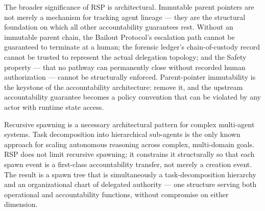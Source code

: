 The broader significance of RSP is architectural. Immutable parent pointers are not merely a mechanism for tracking agent lineage — they are the structural foundation on which all other accountability guarantees rest. Without an immutable parent chain, the Bailout Protocol's escalation path cannot be guaranteed to terminate at a human; the forensic ledger's chain-of-custody record cannot be trusted to represent the actual delegation topology; and the Safety property — that no pathway can permanently close without recorded human authorization — cannot be structurally enforced. Parent-pointer immutability is the keystone of the \bxthree{} accountability architecture: remove it, and the upstream accountability guarantee becomes a policy convention that can be violated by any actor with runtime state access.

Recursive spawning is a necessary architectural pattern for complex multi-agent systems. Task decomposition into hierarchical sub-agents is the only known approach for scaling autonomous reasoning across complex, multi-domain goals. RSP does not limit recursive spawning; it constrains it structurally so that each spawn event is a first-class accountability transfer, not merely a creation event. The result is a spawn tree that is simultaneously a task-decomposition hierarchy and an organizational chart of delegated authority — one structure serving both operational and accountability functions, without compromise on either dimension.
